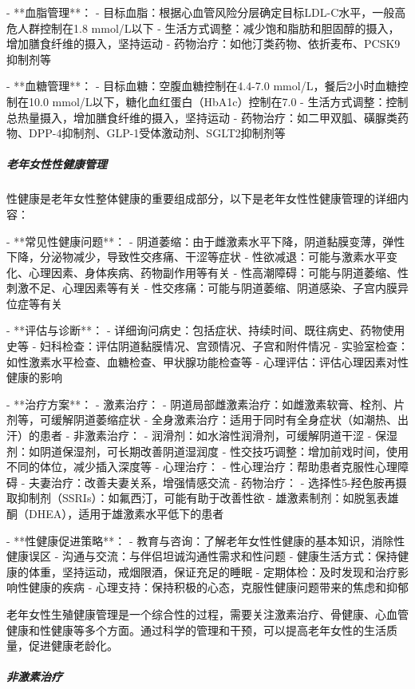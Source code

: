 \begin{enumerate}
- **血脂管理**：
  - 目标血脂：根据心血管风险分层确定目标LDL-C水平，一般高危人群控制在1.8 mmol/L以下
  - 生活方式调整：减少饱和脂肪和胆固醇的摄入，增加膳食纤维的摄入，坚持运动
  - 药物治疗：如他汀类药物、依折麦布、PCSK9抑制剂等

- **血糖管理**：
  - 目标血糖：空腹血糖控制在4.4-7.0 mmol/L，餐后2小时血糖控制在10.0 mmol/L以下，糖化血红蛋白（HbA1c）控制在7.0%
  - 生活方式调整：控制总热量摄入，增加膳食纤维的摄入，坚持运动
  - 药物治疗：如二甲双胍、磺脲类药物、DPP-4抑制剂、GLP-1受体激动剂、SGLT2抑制剂等

\subparagraph{老年女性性健康管理}

性健康是老年女性整体健康的重要组成部分，以下是老年女性性健康管理的详细内容：

- **常见性健康问题**：
  - 阴道萎缩：由于雌激素水平下降，阴道黏膜变薄，弹性下降，分泌物减少，导致性交疼痛、干涩等症状
  - 性欲减退：可能与激素水平变化、心理因素、身体疾病、药物副作用等有关
  - 性高潮障碍：可能与阴道萎缩、性刺激不足、心理因素等有关
  - 性交疼痛：可能与阴道萎缩、阴道感染、子宫内膜异位症等有关

- **评估与诊断**：
  - 详细询问病史：包括症状、持续时间、既往病史、药物使用史等
  - 妇科检查：评估阴道黏膜情况、宫颈情况、子宫和附件情况
  - 实验室检查：如性激素水平检查、血糖检查、甲状腺功能检查等
  - 心理评估：评估心理因素对性健康的影响

- **治疗方案**：
  - 激素治疗：
    - 阴道局部雌激素治疗：如雌激素软膏、栓剂、片剂等，可缓解阴道萎缩症状
    - 全身激素治疗：适用于同时有全身症状（如潮热、出汗）的患者
  - 非激素治疗：
    - 润滑剂：如水溶性润滑剂，可缓解阴道干涩
    - 保湿剂：如阴道保湿剂，可长期改善阴道湿润度
    - 性交技巧调整：增加前戏时间，使用不同的体位，减少插入深度等
  - 心理治疗：
    - 性心理治疗：帮助患者克服性心理障碍
    - 夫妻治疗：改善夫妻关系，增强情感交流
  - 药物治疗：
    - 选择性5-羟色胺再摄取抑制剂（SSRIs）：如氟西汀，可能有助于改善性欲
    - 雄激素制剂：如脱氢表雄酮（DHEA），适用于雄激素水平低下的患者

- **性健康促进策略**：
  - 教育与咨询：了解老年女性性健康的基本知识，消除性健康误区
  - 沟通与交流：与伴侣坦诚沟通性需求和性问题
  - 健康生活方式：保持健康的体重，坚持运动，戒烟限酒，保证充足的睡眠
  - 定期体检：及时发现和治疗影响性健康的疾病
  - 心理支持：保持积极的心态，克服性健康问题带来的焦虑和抑郁

老年女性生殖健康管理是一个综合性的过程，需要关注激素治疗、骨健康、心血管健康和性健康等多个方面。通过科学的管理和干预，可以提高老年女性的生活质量，促进健康老龄化。

\subparagraph{非激素治疗}


\end{enumerate}
